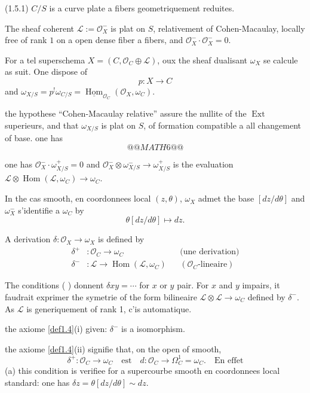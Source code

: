 \documentclass[11pt,a4paper]{article}
\theoremstyle{plain}
\theoremstyle{definition}
\DeclareMathOperator{\Ext}{Ext}
\DeclareMathOperator{\Hom}{Hom}
\begin{document}
\noindent (1.5.1) $C/S$ is a curve plate a fibers geometriquement reduites.

The sheaf coherent $\mathcal{L} := \mathcal{O}_X^-$ is plat on $S$, relativement of Cohen-Macaulay, locally free of rank $1$ on a open dense fiber a fibers, and $\mathcal{O}_X^- \cdot \mathcal{O}_X^- = 0$.

For a tel superschema $X = (C, \mathcal{O}_C \oplus \mathcal{L})$, oux the sheaf dualisant $\omega_X$ se calcule as suit. One dispose of
\[
p : X \longrightarrow C
\]
and $\omega_{X/S} = p^!\omega_{C/S} = \underline{\Hom}_{\mathcal{O}_C}(\mathcal{O}_X, \omega_C)$.

the hypothese ``Cohen-Macaulay relative'' assure the nullite of the $\Ext$ superieurs, and that $\omega_{X/S}$ is plat on $S$, of formation compatible a all changement of base. one has
\[
@@MATH6@@
\]

one has $\mathcal{O}_X^- \cdot \omega_{X/S}^+ = 0$ and $\mathcal{O}_X^- \otimes \omega_{X/S}^- \to \omega_{X/S}^+$ is the evaluation $\mathcal{L} \otimes \Hom(\mathcal{L},\omega_C) \to \omega_C$.

\newpage

In the cas smooth, en coordonnees local $(z,\theta)$, $\omega_X$ admet the base $[dz/d\theta]$ and $\omega_X^-$ s'identifie a $\omega_C$ by
\[
\theta[dz/d\theta] \longmapsto dz.
\]

A derivation $\delta : \mathcal{O}_X \to \omega_X$ is defined by
\[
\begin{aligned}
\delta^+ &: \mathcal{O}_C \longrightarrow \omega_C && \text{(une derivation)} \\
\delta^- &: \mathcal{L} \longrightarrow \Hom(\mathcal{L}, \omega_C) && (\mathcal{O}_C\text{-lineaire})
\end{aligned}
\]

The conditions ( ) donnent $\delta xy = \cdots$ for $x$ or $y$ pair. For $x$ and $y$ impairs, it faudrait exprimer the symetrie of the form bilineaire $\mathcal{L} \otimes \mathcal{L} \to \omega_C$ defined by $\delta^-$. As $\mathcal{L}$ is generiquement of rank 1, c'is automatique.

the axiome \ref{def1.4}(i) given: $\delta^-$ is a isomorphism.

the axiome \ref{def1.4}(ii) signifie that, on the open of smooth,
\[
\delta^+ : \mathcal{O}_C \to \omega_C \quad \text{est} \quad d : \mathcal{O}_C \to \Omega^1_C = \omega_C. \quad \text{En effet}
\]
(a) this condition is verifiee for a supercourbe smooth en coordonnees local standard: one has $\delta z = \theta[dz/d\theta] \sim dz$.
\end{document}
